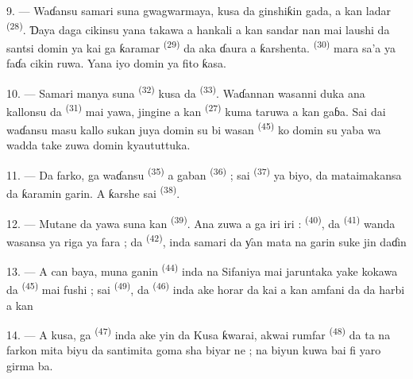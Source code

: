 9. --- Waɗansu samari suna gwagwarmaya, kusa da ginshiƙin gada, a
kan ladar  \textsuperscript{(28)}. Ɗaya daga
cikinsu yana takawa a hankali a kan sandar nan mai laushi da santsi
domin ya kai ga ƙaramar  \textsuperscript{(29)} da aka
ɗaura a ƙarshenta.  \textsuperscript{(30)}
mara sa’a ya faɗa cikin ruwa. Yana iyo domin ya fito ƙasa.

10. --- Samari manya suna 
\textsuperscript{(32)} kusa da 
\textsuperscript{(33)}. Waɗannan wasanni duka ana kallonsu da
 \textsuperscript{(31)} mai yawa, jingine a kan
  \textsuperscript{(27)} kuma taruwa a kan
gaɓa. Sai dai waɗansu masu kallo sukan juya domin su bi wasan
 \textsuperscript{(45)} ko domin su yaba wa
 wadda take zuwa domin 
kyaututtuka.

11. --- Da farko, ga waɗansu 
\textsuperscript{(35)} a gaban  \textsuperscript{(36)} ;
sai  \textsuperscript{(37)} ya biyo, da
mataimakansa da  ƙaramin garin. A ƙarshe sai
 \textsuperscript{(38)}.

\VUsaut{5.0mm}
\VUsaut{3.6mm}

12. --- Mutane da yawa suna kan 
\textsuperscript{(39)}. Ana zuwa a ga  iri iri :
 \textsuperscript{(40)}, da 
\textsuperscript{(41)} wanda wasansa ya riga ya fara ; da  \textsuperscript{(42)}, inda samari da ƴan mata na garin suke
jin daɗin 

13. --- A can baya, muna ganin 
\textsuperscript{(44)} inda  na Sifaniya
mai jaruntaka yake kokawa da  \textsuperscript{(45)} mai
fushi ; sai  \textsuperscript{(49)}, da
 \textsuperscript{(46)} inda ake horar da kai a kan
amfani da  da harbi a kan 

14. --- A kusa, ga 
\textsuperscript{(47)} inda ake yin  da
 Kusa ƙwarai, akwai rumfar
 \textsuperscript{(48)} da ta   na farkon mita biyu da santimita goma sha
biyar ne ; na biyun kuwa bai fi yaro girma ba.


